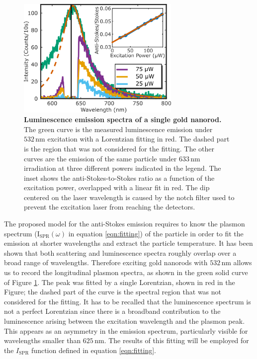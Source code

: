 \documentclass[journal=nalefd,manuscript=letter]{achemso}
\newcommand{\nm}{\ensuremath{\,\textrm{nm}}}
\begin{document}
\begin{figure}[tp] \centering
\includegraphics[width=78.4mm]{Figures/02_Several_Intensities/02_several_intensities.png}
\caption{\textbf{Luminescence emission spectra of a single gold nanorod.} The green curve is the
measured luminescence emission under $532\nm$ excitation with a Lorentzian fitting in red. The
dashed part is the region that was not considered for the fitting. The other
curves are the emission of the same particle under $633\nm$ irradiation at three 
different powers indicated in the legend. The inset shows the anti-Stokes-to-Stokes ratio as a function
of the excitation power, overlapped with a linear fit in red. The dip centered on the laser wavelength
is caused by the notch filter used to prevent the excitation laser from reaching the detectors.}
	\label{fig:spectra_intensity}
\end{figure}

The proposed model for the anti-Stokes emission requires to know the plasmon
spectrum ($\textrm{I}_{\textrm{SPR}}(\omega)$ in equation \ref{eqn:fitting}) of
the particle in order to fit the emission at shorter wavelengths and extract the
particle temperature. It has been shown that both scattering and luminescence
spectra roughly overlap over a broad range of wavelengths\cite{Yorulmaz2012}. Therefore
exciting gold nanorods with $532\nm$ allows us to record the longitudinal
plasmon spectra, as shown in the green solid curve of Figure \ref{fig:spectra_intensity}. The
peak was fitted by a single Lorentzian, shown in red in the Figure; the dashed
part of the curve is the spectral region that was not considered for the
fitting. It has to be recalled that the luminescence spectrum is not a perfect
Lorentzian since there is a broadband contribution to the luminescence arising
between the excitation wavelength and the plasmon peak\cite{Boyd1986}. This
appears as an asymmetry in the emission spectrum, particularly visible for
wavelengths smaller than $625\nm$. The results of this fitting will be employed
for the $I_\textrm{SPR}$ function defined in equation \ref{eqn:fitting}. 
\end{document}
